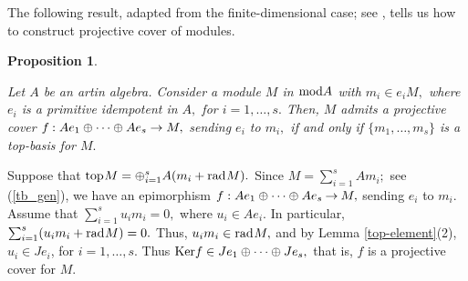 \documentclass[10pt]{amsart}
\newtheorem{Prop}[Theo]{Proposition}
\newtheorem{Lemma}[Theo]{Lemma}
\theoremstyle{definition}
\newcommand{\mmod}{{\rm mod}}
\newcommand{\rad}{{\rm rad}\hspace{.5pt}}
\newcommand{\soc}{{\rm soc}\hspace{.5pt}}
\newcommand{\ntop}{{\rm top}\hspace{.5pt}}
\newcommand{\Ker}{{\rm Ker}}
\begin{document}
\smallskip

The following result, adapted from the finite-dimensional case; see \cite[(1.1)]{LiM}, tells us how to construct projective cover of modules. 

\vspace{-1pt}




\begin{Prop}\label{tb-projc-ienv}

Let $A$ be an artin algebra. Consider a module $M$ in $\mmod A$ with $m_i\in e_iM,$ where $e_i$ is a primitive idempotent in $A,$ for $i=1, \ldots, s.$ Then, $M$ admits a projective cover $f\hspace{-.5pt}: Ae_1\oplus \cdots \oplus Ae_s \to M,$ sending $e_i$ to $m_i,$ if and only if $\{m_1, \ldots, m_s\}$ is a top-basis for $M.$

\end{Prop}

\vspace{-1.5pt}

 Suppose that $\ntop M= \oplus_{i=1}^s A(m_i+\rad M).$ Since $M=\sum_{i=1}^s Am_i;$ see (\ref{tb_gen}), we have an epimorphism $f: Ae_1 \oplus \cdots \oplus A e_s \hspace{-.5pt}\to \hspace{-.5pt} M,$ sending $e_i$ to $m_i.$ Assume that  $\sum_{i=1}^s u_i m_i=0,$ where $u_i\in Ae_i.$ In particular, $\sum_{i=1}^s (u_im_i + \rad M)=0.$ Thus, $u_im_i\in \rad M,$ and by Lemma \ref{top-element}(2), $u_i\in Je_i$, for $i=1, \ldots, s$. Thus $\Ker f\in Je_1 \oplus \cdots \oplus Je_s,$ that is, $f$ is a projective cover for $M$.
\end{document}
